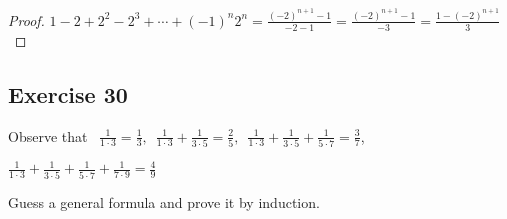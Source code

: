 \documentclass[14pt]{extarticle}
\newcommand{\dps}{\displaystyle}
\begin{document}
\begin{proof}
    $\dps 1 - 2 + 2^2 - 2^3 + \cdots + (-1)^n 2^n = \frac{(-2)^{n+1} - 1}{-2 - 1} = \frac{(-2)^{n+1} - 1}{-3} = \frac{1 - (-2)^{n+1}}{3}$
\end{proof}

\subsection{Exercise 30}
Observe that $\,\,\,\dps \frac{1}{1 \cdot 3} = \dps \frac{1}{3}, \,\,\, \frac{1}{1 \cdot 3} + \frac{1}{3 \cdot 5} = \dps \frac{2}{5}, \,\,\, \frac{1}{1 \cdot 3} + \frac{1}{3 \cdot 5} + \frac{1}{5 \cdot 7} = \dps \frac{3}{7}$,

$\dps \frac{1}{1 \cdot 3} + \frac{1}{3 \cdot 5} + \frac{1}{5 \cdot 7} + \frac{1}{7 \cdot 9} = \dps \frac{4}{9}$

Guess a general formula and prove it by induction.
\end{document}
